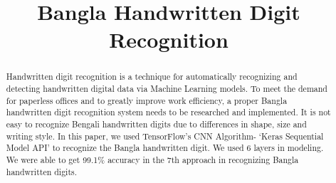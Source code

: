 \documentclass[conference]{IEEEtran}
\begin{document}
\title{Bangla Handwritten Digit Recognition\\


}


\author{
\and
{}
\and

\and


}

\maketitle

\begin{abstract}
Handwritten digit recognition is a technique for automatically recognizing and detecting handwritten digital data via Machine Learning models. To meet the demand for paperless offices and to greatly improve work efficiency, a proper Bangla handwritten digit recognition system needs to be researched and implemented. It is not easy to recognize Bengali handwritten digits due to differences in shape, size and writing style. In this paper, we used TensorFlow’s CNN Algorithm- ‘Keras Sequential Model API’ to recognize the Bangla handwritten digit. We used 6 layers in modeling. We were able to get 99.1\% accuracy in the 7th approach in recognizing Bangla handwritten digits.


\end{abstract}
\end{document}
